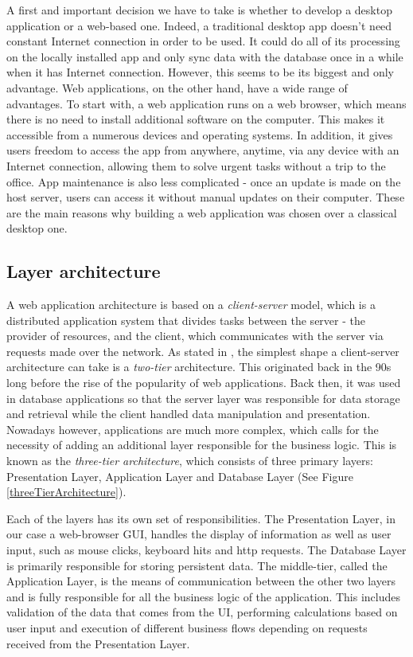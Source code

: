 A first and important decision we have to take is whether to develop a desktop application or a web-based one. Indeed, a traditional desktop app doesn't need constant Internet connection in order to be used. It could do all of its processing on the locally installed app and only sync data with the database once in a while when it has Internet connection. However, this seems to be its biggest and only advantage. Web applications, on the other hand, have a wide range of advantages. To start with, a web application runs on a web browser, which means there is no need to install additional software on the computer. This makes it accessible from a numerous devices and operating systems. In addition, it gives users freedom to access the app from anywhere, anytime, via any device with an Internet connection, allowing them to solve urgent tasks without a trip to the office. App maintenance is also less complicated - once an update is made on the host server, users can access it without manual updates on their computer. These are the main reasons why building a web application was chosen over a classical desktop one.


\subsection{Layer architecture}
\label{subsection:layerArchitecture}

A web application architecture is based on a \textit{client-server} model, which is a distributed application system that divides tasks between the server - the provider of resources, and the client, which communicates with the server via requests made over the network. As stated in \cite{databaseProgrammingWithJdbcAndJava}, the simplest shape a client-server architecture can take is a \textit{two-tier} architecture. This originated back in the 90s long before the rise of the popularity of web applications. Back then, it was used in database applications so that the server layer was responsible for data storage and retrieval while the client handled data manipulation and presentation. Nowadays however, applications are much more complex, which calls for the necessity of adding an additional layer responsible for the business logic. This is known as the \textit{three-tier architecture}, which consists of three primary layers: Presentation Layer, Application Layer and Database Layer (See Figure \ref{threeTierArchitecture}).

Each of the layers has its own set of responsibilities. The Presentation Layer, in our case a web-browser GUI, handles the display of information as well as user input, such as mouse clicks, keyboard hits and http requests. The Database Layer is primarily responsible for storing persistent data. The middle-tier, called the Application Layer, is the means of communication between the other two layers and is fully responsible for all the business logic of the application. This includes validation of the data that comes from the UI, performing calculations based on user input and execution of different business flows depending on requests received from the Presentation Layer.

